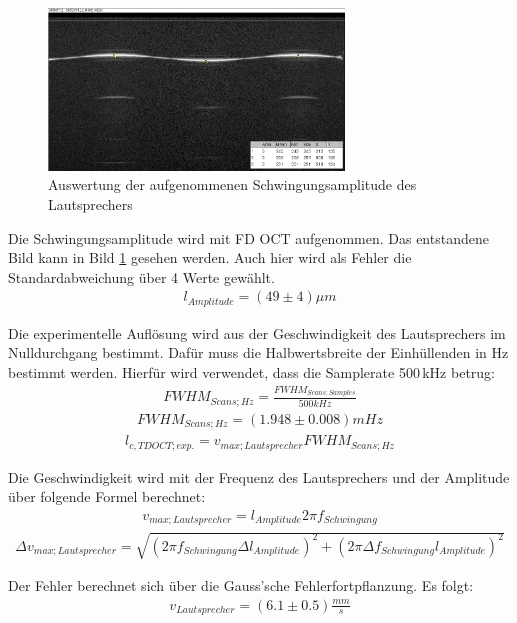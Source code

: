 \documentclass[german, %
parskip=full, %
bibliography=totoc, %
]{scrartcl}
\begin{document}
\begin{figure}[hb] 
  \centering
    \includegraphics[width=0.7\textwidth]{Amplitude_Beispiel}
  \caption{Auswertung der aufgenommenen Schwingungsamplitude des Lautsprechers}
  \label{fig:amplitude}
\end{figure}

Die Schwingungsamplitude wird mit FD OCT aufgenommen. Das entstandene Bild kann in Bild \ref{fig:amplitude} gesehen werden. Auch hier wird als Fehler die Standardabweichung über 4 Werte gewählt.
\begin{align*}
l_{Amplitude} = (49 \pm 4) \mu m
\end{align*}

Die experimentelle Auflösung wird aus der Geschwindigkeit des Lautsprechers im Nulldurchgang bestimmt. Dafür muss die Halbwertsbreite der Einhüllenden in Hz bestimmt werden. Hierfür wird verwendet, dass die Samplerate 500\,kHz betrug:
\begin{align}
FWHM_{Scans;Hz} = \frac{FWHM_{Scans;Samples}}{500 kHz}
\end{align}
\begin{align*}
FWHM_{Scans;Hz} = (1.948 \pm 0.008) mHz
\end{align*}
\begin{align}
l_{c, TD OCT; exp.} = v_{max; Lautsprecher} FWHM_{Scans;Hz}
\end{align}

Die Geschwindigkeit wird mit der Frequenz des Lautsprechers und der Amplitude über folgende Formel berechnet:
\begin{align}
v_{max; Lautsprecher} = l_{Amplitude} 2 \pi f_{Schwingung} 
\end{align}
\begin{align}
\Delta v_{max; Lautsprecher} = \sqrt{(2 \pi f_{Schwingung} \Delta l_{Amplitude})^2 + (2 \pi \Delta f_{Schwingung} l_{Amplitude})^2}
\end{align}

Der Fehler berechnet sich über die Gauss'sche Fehlerfortpflanzung. Es folgt:
\begin{align*}
v_{Lautsprecher} = (6.1 \pm 0.5) \frac{mm}{s}
\end{align*}
 
\end{document}
